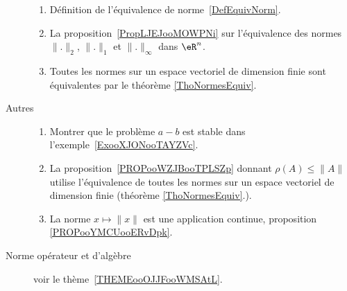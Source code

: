\begin{description}
	      \begin{enumerate}
		      \item
		            Définition de l'équivalence de norme~\ref{DefEquivNorm}.
		      \item
		            La proposition~\ref{PropLJEJooMOWPNi} sur l'équivalence des normes \( \| . \|_2\), \( \| . \|_1\) et \( \| . \|_{\infty}\)  dans \( \eR^n\).
		      \item
		            Toutes les normes sur un espace vectoriel de dimension finie sont équivalentes par le théorème \ref{ThoNormesEquiv}.
	      \end{enumerate}
	\item[Autres]
	      \begin{enumerate}
		      \item
		            Montrer que le problème \( a-b\) est stable dans l'exemple~\ref{ExooXJONooTAYZVc}.
		      \item
		            La proposition~\ref{PROPooWZJBooTPLSZp} donnant \( \rho(A)\leq \| A \|\) utilise l'équivalence de toutes les normes sur un espace vectoriel de dimension finie (théorème \ref{ThoNormesEquiv}.).
		      \item
		            La norme \( x\mapsto \| x \|\) est une application continue, proposition \ref{PROPooYMCUooERvDpk}.
	      \end{enumerate}
	\item[Norme opérateur et d'algèbre] voir le thème~\ref{THEMEooOJJFooWMSAtL}.

\end{description}
